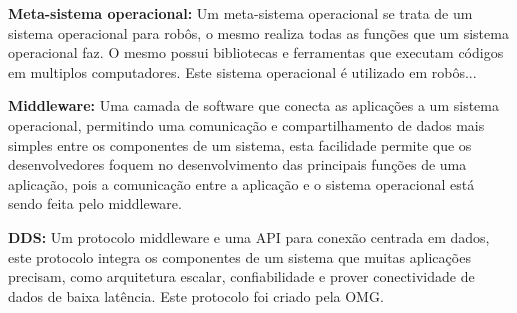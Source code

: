 \textbf{Meta-sistema operacional:} Um meta-sistema operacional se trata de um sistema operacional para robôs, o mesmo realiza todas as funções que um sistema operacional faz. O mesmo possui bibliotecas e ferramentas que executam códigos em multiplos computadores. Este sistema operacional é utilizado em robôs...

\textbf{Middleware:} Uma camada de software que conecta as aplicações a um sistema operacional, permitindo uma comunicação e compartilhamento de dados mais simples entre os componentes de um sistema, esta facilidade permite que os desenvolvedores foquem no desenvolvimento das principais funções de uma aplicação, pois a comunicação entre a aplicação e o sistema operacional está sendo feita pelo middleware.

\textbf{DDS:} Um protocolo middleware e uma API para conexão centrada em dados, este protocolo integra os componentes de um sistema que muitas aplicações precisam, como arquitetura escalar, confiabilidade e prover conectividade de dados de baixa latência. Este protocolo foi criado pela OMG.


